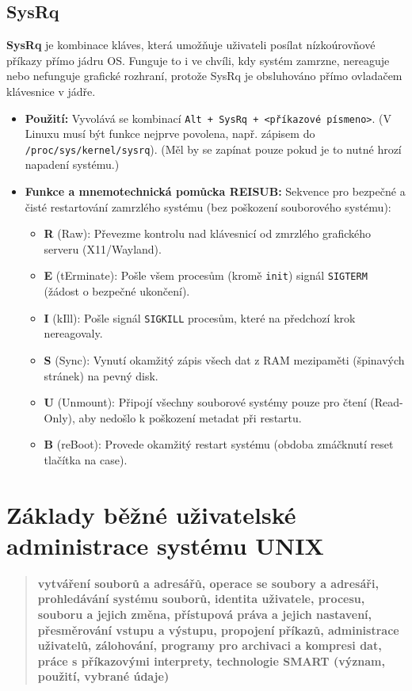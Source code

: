 \subsection{SysRq}
\textbf{SysRq} je kombinace kláves, která umožňuje uživateli posílat nízkoúrovňové příkazy přímo jádru OS. Funguje to i ve chvíli, kdy systém zamrzne, nereaguje nebo nefunguje grafické rozhraní, protože SysRq je obsluhováno přímo ovladačem klávesnice v jádře.
\begin{itemize}
    \item \textbf{Použití:} Vyvolává se kombinací \texttt{Alt + SysRq + <příkazové písmeno>}. (V Linuxu musí být funkce nejprve povolena, např. zápisem do \texttt{/proc/sys/kernel/sysrq}). (Měl by se zapínat pouze pokud je to nutné hrozí napadení systému.)
    \item \textbf{Funkce a mnemotechnická pomůcka REISUB:} Sekvence pro bezpečné a čisté restartování zamrzlého systému (bez poškození souborového systému):
    \begin{itemize}
        \item \textbf{R} (Raw): Převezme kontrolu nad klávesnicí od zmrzlého grafického serveru (X11/Wayland).
        \item \textbf{E} (tErminate): Pošle všem procesům (kromě \texttt{init}) signál \texttt{SIGTERM} (žádost o bezpečné ukončení).
        \item \textbf{I} (kIll): Pošle signál \texttt{SIGKILL} procesům, které na předchozí krok nereagovaly.
        \item \textbf{S} (Sync): Vynutí okamžitý zápis všech dat z RAM mezipaměti (špinavých stránek) na pevný disk.
        \item \textbf{U} (Unmount): Připojí všechny souborové systémy pouze pro čtení (Read-Only), aby nedošlo k poškození metadat při restartu.
        \item \textbf{B} (reBoot): Provede okamžitý restart systému (obdoba zmáčknutí reset tlačítka na case).
    \end{itemize}
\end{itemize}

\section{Základy běžné uživatelské administrace systému UNIX}
\begin{quote}
    \textbf{vytváření souborů a adresářů, operace se soubory a adresáři, prohledávání systému souborů, identita uživatele, procesu, souboru a jejich změna, přístupová práva a jejich nastavení, přesměrování vstupu a výstupu, propojení příkazů, administrace uživatelů, zálohování, programy pro archivaci a kompresi dat, práce s příkazovými interprety, technologie SMART (význam, použití, vybrané údaje)}
\end{quote}

